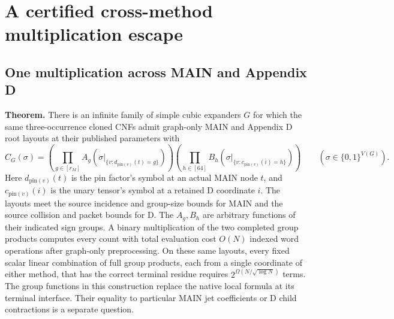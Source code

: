 \documentclass[
  11pt,
]{article}
\begin{document}
\section{A certified cross-method multiplication
escape}\label{a-certified-cross-method-multiplication-escape}

\subsection{One multiplication across MAIN and Appendix
D}\label{one-multiplication-across-main-and-appendix-d}

\textbf{Theorem.} There is an infinite family of simple cubic expanders
\(G\) for which the same three-occurrence cloned CNFs admit graph-only
MAIN and Appendix D root layouts at their published parameters with \[
 C_G(\sigma)=
 \left(\prod_{g\in[r_M]} A_g(\sigma|_{\{v:d_{\mathrm{pin}(v)}(t)=g\}})\right)
 \left(\prod_{h\in[64]} B_h(\sigma|_{\{v:c_{\mathrm{pin}(v)}(i)=h\}})\right)
 \qquad(\sigma\in\{0,1\}^{V(G)}).
\] Here \(d_{\mathrm{pin}(v)}(t)\) is the pin factor's symbol at an
actual MAIN node \(t\), and \(c_{\mathrm{pin}(v)}(i)\) is the unary
tensor's symbol at a retained D coordinate \(i\). The layouts meet the
source incidence and group-size bounds for MAIN and the source collision
and packet bounds for D. The \(A_g,B_h\) are arbitrary functions of
their indicated sign groups. A binary multiplication of the two
completed group products computes every count with total evaluation cost
\(O(N)\) indexed word operations after graph-only preprocessing. On
these same layouts, every fixed scalar linear combination of full group
products, each from a single coordinate of either method, that has the
correct terminal residue requires \(2^{\Omega(N/\sqrt{\log N})}\) terms.
The group functions in this construction replace the native local
formula at its terminal interface. Their equality to particular MAIN jet
coefficients or D child contractions is a separate question.
\end{document}

